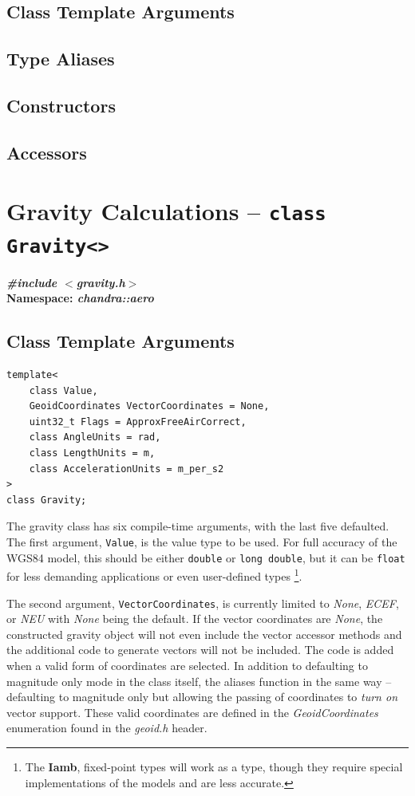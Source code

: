 \documentclass[10pt,letterpaper]{memoir} %
\newcommand{\apiheader}[2]{\noindent{}\textbf{\emph{\#include $<$#1$>$}}\\\noindent{}\textbf{Namespace: \emph{#2}}}
\begin{document}
\subsection{Class Template Arguments}
\subsection{Type Aliases}
\subsection{Constructors}
\subsection{Accessors}

\section{Gravity Calculations -- \texttt{class Gravity<>}}
\label{sec:gravity:calculation:api}
\apiheader{gravity.h}{chandra::aero}
\subsection{Class Template Arguments}
\begin{verbatim}
template<
	class Value,
	GeoidCoordinates VectorCoordinates = None,
	uint32_t Flags = ApproxFreeAirCorrect,
	class AngleUnits = rad,
	class LengthUnits = m,
	class AccelerationUnits = m_per_s2
>
class Gravity;	
\end{verbatim}
The gravity class has six compile-time arguments, with the last five defaulted.  The first argument, \texttt{Value}, is the value type to be used.  For full accuracy of the WGS84 model, this should be either \texttt{double} or \texttt{long double}, but it can be \texttt{float} for less demanding applications or even user-defined types \footnote{The \textbf{Iamb}, fixed-point types will work as a type, though they require special implementations of the models and are less accurate.}.  

The second argument, \texttt{VectorCoordinates}, is currently limited to \emph{None}, \emph{ECEF}, or \emph{NEU} with \emph{None} being the default.  If the vector coordinates are \emph{None}, the constructed gravity object will not even include the vector accessor methods and the additional code to generate vectors will not be included.  The code is added when a valid form of coordinates are selected.  In addition to defaulting to magnitude only mode in the class itself, the aliases function in the same way -- defaulting to magnitude only but allowing the passing of coordinates to \emph{turn on} vector support.  These valid coordinates are defined in the \emph{GeoidCoordinates} enumeration found in the \emph{geoid.h} header.
\end{document}
